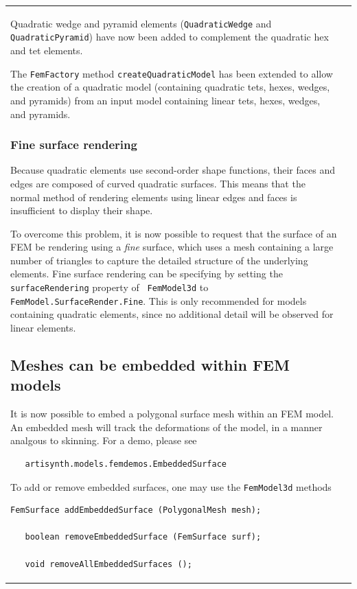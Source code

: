 \documentclass{article}
\begin{document}
\begin{tabular}{ll}
Quadratic wedge and pyramid elements ({\tt QuadraticWedge} and {\tt
QuadraticPyramid}) have now been added to complement the quadratic hex
and tet elements.

The {\tt FemFactory} method {\tt createQuadraticModel} has been
extended to allow the creation of a quadratic model (containing
quadratic tets, hexes, wedges, and pyramids) from an input model
containing linear tets, hexes, wedges, and pyramids.

\subsubsection*{Fine surface rendering}

Because quadratic elements use second-order shape functions, their
faces and edges are composed of curved quadratic surfaces. This means
that the normal method of rendering elements using linear edges and
faces is insufficient to display their shape. 

To overcome this problem, it is now possible to request that the
surface of an FEM be rendering using a {\it fine} surface, which uses
a mesh containing a large number of triangles to capture the detailed
structure of the underlying elements. Fine surface rendering can be
specifying by setting the {\tt surfaceRendering} property of {\tt
FemModel3d} to {\tt FemModel.SurfaceRender.Fine}. This is only
recommended for models containing quadratic elements, since no additional
detail will be observed for linear elements.

\subsection*{Meshes can be embedded within FEM models}

It is now possible to embed a polygonal surface mesh within an FEM
model. An embedded mesh will track the deformations of the model, in a
manner analgous to skinning. For a demo, please see
\begin{verbatim}
   artisynth.models.femdemos.EmbeddedSurface
\end{verbatim}

To add or remove embedded surfaces, one may use the {\tt FemModel3d}
methods
\begin{lstlisting}[]
   FemSurface addEmbeddedSurface (PolygonalMesh mesh);

   boolean removeEmbeddedSurface (FemSurface surf);

   void removeAllEmbeddedSurfaces ();
\end{lstlisting}


\end{tabular}
\end{document}
